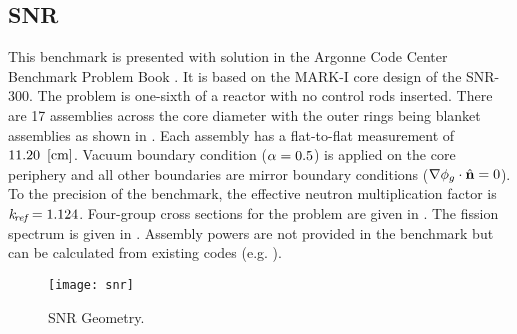   \subsection{SNR}
    \label{sec:snr}
    This benchmark is presented with solution in the Argonne Code Center
    Benchmark Problem Book \cite{argonneBenchmark}. It is based on the MARK-I
    core design of the SNR-300. The problem is one-sixth of a reactor with no
    control rods inserted. There are 17 assemblies across the core diameter with
    the outer rings being blanket assemblies as shown in .
    Each assembly has a flat-to-flat measurement of ${11.20~\left[\text{{cm}}\right]}$. Vacuum
    boundary condition ($\alpha = 0.5$) is applied on the core periphery and
    all other boundaries are mirror boundary conditions ($\mathbf{\nabla} \phi_g \cdot
    \hat{\mathbf{n}} = 0$). To the precision of the benchmark, the effective neutron
    multiplication factor is $k_{\!\mbox{\scriptsize \em ref}} = 1.124$. Four-group cross sections for the
    problem are given in . The fission spectrum is given in
    . Assembly powers are not provided in the benchmark but can
    be calculated from existing codes (e.g. \dif).

    \begin{figure}
      \centering
      \texttt{[image: snr]}
      \caption{SNR Geometry.}
      \label{fig:snr_geom}
    \end{figure}

